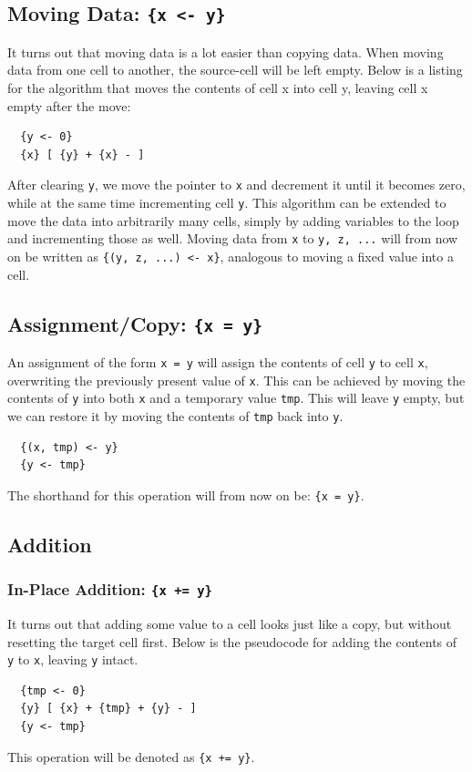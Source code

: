 \subsection{Moving Data: \texttt{\{x <- y\}}}
It turns out that moving data is a lot easier than copying data. When moving data from one cell to another, the source-cell will be left empty. Below is a listing for the algorithm that moves the contents of cell x into cell y, leaving cell x empty after the move:
\begin{lstlisting}
  {y <- 0} 
  {x} [ {y} + {x} - ]
\end{lstlisting}
After clearing \texttt{y}, we move the pointer to \texttt{x} and decrement it until it becomes zero, while at the same time incrementing cell \texttt{y}. This algorithm can be extended to move the data into arbitrarily many cells, simply by adding variables to the loop and incrementing those as well. Moving data from \texttt{x} to \texttt{y, z, ...} will from now on be written as \texttt{\{(y, z, ...) <- x\}}, analogous to moving a fixed value into a cell.

\subsection{Assignment/Copy: \texttt{\{x = y\}}}
An assignment of the form \texttt{x = y} will assign the contents of cell \texttt{y} to cell \texttt{x}, overwriting the previously present value of \texttt{x}. This can be achieved by moving the contents of \texttt{y} into both \texttt{x} and a temporary value \texttt{tmp}. This will leave \texttt{y} empty, but we can restore it by moving the contents of \texttt{tmp} back into \texttt{y}.
\begin{lstlisting}
  {(x, tmp) <- y}
  {y <- tmp}
\end{lstlisting}
The shorthand for this operation will from now on be: \texttt{\{x = y\}}.

\subsection{Addition}
\subsubsection{In-Place Addition: \texttt{\{x += y\}}}
It turns out that adding some value to a cell looks just like a copy, but without resetting the target cell first. Below is the pseudocode for adding the contents of \texttt{y} to \texttt{x}, leaving \texttt{y} intact.
\begin{lstlisting}
  {tmp <- 0}
  {y} [ {x} + {tmp} + {y} - ]
  {y <- tmp}
\end{lstlisting}
This operation will be denoted as \texttt{\{x += y\}}.

